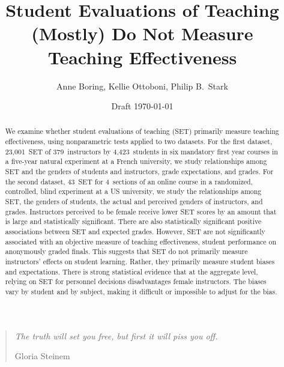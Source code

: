 \documentclass[12pt]{article}
\title{Student Evaluations of Teaching (Mostly) Do Not Measure Teaching Effectiveness}
\author{Anne Boring, Kellie Ottoboni, Philip B.~Stark}
\date{Draft \today}
\begin{document}
\maketitle

\newpage
\begin{quotation}
    \emph{The truth will set you free, but first it will piss you off.}
    
     \hfill Gloria Steinem

\begin{abstract}

We examine whether student evaluations of teaching (SET) 
primarily measure teaching effectiveness, using nonparametric tests applied
to two datasets. 
For the first dataset, 23,001~SET of 379~instructors by 4,423~students in six 
mandatory first year courses in a five-year natural experiment at a French university, 
we study relationships among SET and the genders of students and instructors, 
grade expectations, and grades.
For the second dataset, 43~SET for 4~sections of an online course in a randomized, controlled, 
blind experiment at a US university, 
we study the relationships among SET, the genders of students, 
the actual and perceived genders of instructors, and grades.
Instructors perceived to be female receive lower SET scores by an amount that is large and
statistically significant.
There are also statistically significant positive associations between SET and expected grades. 
However, SET are not significantly associated with an objective measure of teaching effectiveness,
student performance on anonymously graded finals. 
This suggests that SET do not primarily measure instructors' 
effects on student learning. 
Rather, they primarily measure student biases and expectations.
There is strong statistical evidence that at the aggregate level, relying on SET for 
personnel decisions disadvantages female instructors.
The biases vary by student and by subject, making it 
difficult or impossible to adjust for the bias. 



\end{abstract}
\end{quotation}
\end{document}
